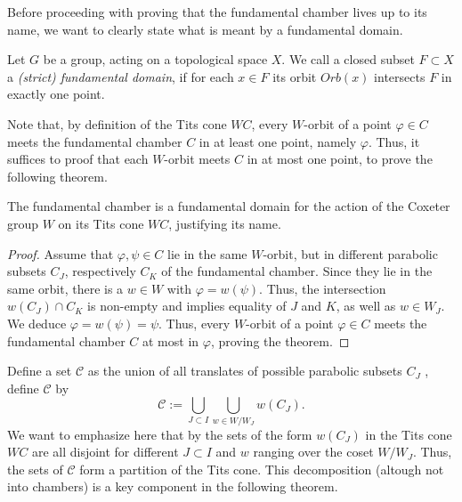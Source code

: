 Before proceeding with proving that the fundamental chamber lives up to its name, we want to clearly state what is meant by a fundamental domain.

\begin{definition}
    Let \(G\) be a group, acting on a topological space \(X\).
    We call a closed subset \(F\subset X\) a \emph{(strict) fundamental domain}, if for each \(x\in F\) its orbit \(Orb(x)\) intersects \(F\) in exactly one point.
\end{definition}

Note that, by definition of the Tits cone \(WC\), every \(W\)-orbit of a point \(\varphi\in C\) meets the fundamental chamber \(C\) in at least one point, namely \(\varphi\).
Thus, it suffices to proof that each \(W\)-orbit meets \(C\) in at most one point, to prove the following theorem.

\begin{theorem}\label{thm:funddomain}
    The fundamental chamber is a fundamental domain for the action of the Coxeter group \(W\) on its Tits cone \(WC\), justifying its name.
\end{theorem}
\begin{proof}
    Assume that \(\varphi,\psi\in C\) lie in the same \(W\)-orbit, but in different parabolic subsets \(C_J\), respectively \(C_K\) of the fundamental chamber. %
    Since they lie in the same orbit, there is a \(w\in W\) with \(\varphi = w(\psi)\).
    Thus, the intersection \(w(C_J)\cap C_K\) is non-empty and  implies equality of \(J\) and \(K\), as well as \(w \in W_J\).
    We deduce \(\varphi = w(\psi) = \psi\).
    Thus, every \(W\)-orbit of a point \(\varphi\in C\) meets the fundamental chamber \(C\) at most in \(\varphi\), proving the theorem.
\end{proof}

Define a set \(\mathcal{C}\) as the union of all translates of possible parabolic subsets \(C_J\) \ie, define \(\mathcal{C}\) by
\[\mathcal{C} := \bigcup_{J \subset I} \bigcup_{w \in W/W_J} w(C_J).\]
We want to emphasize here that by  the sets of the form \(w(C_J)\) in the Tits cone \(WC\) are all disjoint for different \(J \subset I\) and \(w\) ranging over the coset \(W/W_J\).
Thus, the sets of \(\mathcal{C}\) form a partition of the Tits cone.
This decomposition (altough not into chambers) is a key component in the following theorem.

